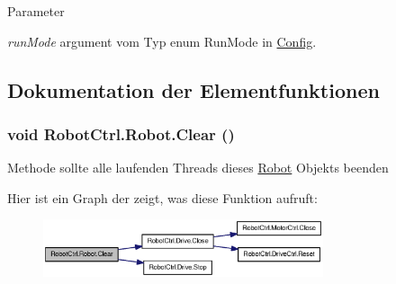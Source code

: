 \begin{DoxyParams}{Parameter}
\item[{\em runMode}]argument vom Typ enum RunMode in \hyperlink{class_robot_ctrl_1_1_config}{Config}. \end{DoxyParams}


\subsection{Dokumentation der Elementfunktionen}
\hypertarget{class_robot_ctrl_1_1_robot_afb01a74bfcb74eab60f041a368f93737}{
\subsubsection[{Clear}]{\setlength{\rightskip}{0pt plus 5cm}void RobotCtrl.Robot.Clear ()}}
\label{class_robot_ctrl_1_1_robot_afb01a74bfcb74eab60f041a368f93737}
Methode sollte alle laufenden Threads dieses \hyperlink{class_robot_ctrl_1_1_robot}{Robot} Objekts beenden 

Hier ist ein Graph der zeigt, was diese Funktion aufruft:\nopagebreak
\begin{figure}[H]
\begin{center}
\leavevmode
\includegraphics[width=233pt]{class_robot_ctrl_1_1_robot_afb01a74bfcb74eab60f041a368f93737_cgraph}
\end{center}
\end{figure}




